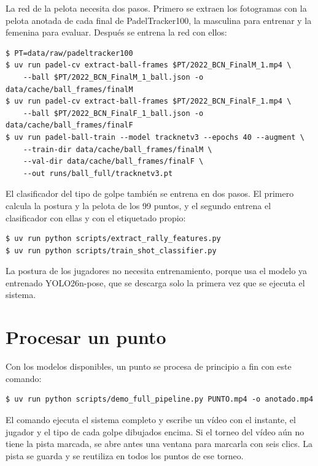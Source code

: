 La red de la pelota necesita dos pasos.
Primero se extraen los fotogramas con la pelota anotada de cada final de PadelTracker100, la masculina para entrenar y la femenina para evaluar.
Después se entrena la red con ellos:
\begin{lstlisting}[style=terminal]
$ PT=data/raw/padeltracker100
$ uv run padel-cv extract-ball-frames $PT/2022_BCN_FinalM_1.mp4 \
    --ball $PT/2022_BCN_FinalM_1_ball.json -o data/cache/ball_frames/finalM
$ uv run padel-cv extract-ball-frames $PT/2022_BCN_FinalF_1.mp4 \
    --ball $PT/2022_BCN_FinalF_1_ball.json -o data/cache/ball_frames/finalF
$ uv run padel-ball-train --model tracknetv3 --epochs 40 --augment \
    --train-dir data/cache/ball_frames/finalM \
    --val-dir data/cache/ball_frames/finalF \
    --out runs/ball_full/tracknetv3.pt
\end{lstlisting}

El clasificador del tipo de golpe también se entrena en dos pasos.
El primero calcula la postura y la pelota de los 99 puntos, y el segundo entrena el clasificador con ellas y con el etiquetado propio:
\begin{lstlisting}[style=terminal]
$ uv run python scripts/extract_rally_features.py
$ uv run python scripts/train_shot_classifier.py
\end{lstlisting}

La postura de los jugadores no necesita entrenamiento, porque usa el modelo ya entrenado YOLO26n-pose, que se descarga solo la primera vez que se ejecuta el sistema.

\section{Procesar un punto}

Con los modelos disponibles, un punto se procesa de principio a fin con este comando:
\begin{lstlisting}[style=terminal]
$ uv run python scripts/demo_full_pipeline.py PUNTO.mp4 -o anotado.mp4
\end{lstlisting}
El comando ejecuta el sistema completo y escribe un vídeo con el instante, el jugador y el tipo de cada golpe dibujados encima.
Si el torneo del vídeo aún no tiene la pista marcada, se abre antes una ventana para marcarla con seis clics.
La pista se guarda y se reutiliza en todos los puntos de ese torneo.

